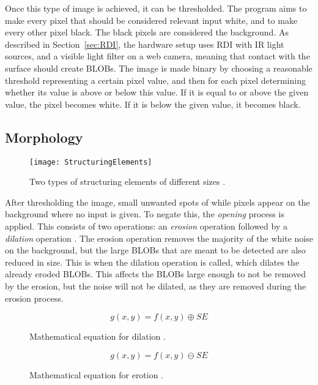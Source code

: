 Once this type of image is achieved, it can be thresholded. The program aims to make every pixel that should be considered relevant input white, and to make every other pixel black. The black pixels are considered the background. As described in Section~\ref{sec:RDI}, the hardware setup uses RDI with IR light sources, and a visible light filter on a web camera, meaning that contact with the surface should create BLOBs. The image is made binary by choosing a reasonable threshold representing a certain pixel value, and then for each pixel determining whether its value is above or below this value. If it is equal to or above the given value, the pixel becomes white. If it is below the given value, it becomes black.
 
\subsection{Morphology}

\begin{figure}[!h]
	\centering
\texttt{[image: StructuringElements]}
\caption{Two types of structuring elements of different sizes \citep{moeslund_introduction_2012}. \label{fig:StructuringElements}}
\end{figure}

After thresholding the image, small unwanted spots of while pixels appear on the background where no input is given. To negate this, the \textit{opening} process is applied. This consists of two operations: an \textit{erosion} operation followed by a \textit{dilation} operation \citep{moeslund_introduction_2012}. The erosion operation removes the majority of the white noise on the background, but the large BLOBs that are meant to be detected are also reduced in size. This is when the dilation operation is called, which dilates the already eroded BLOBs. This affects the BLOBs large enough to not be removed by the erosion, but the noise will not be dilated, as they are removed during the erosion process.

\begin{figure}[!h]
	\centering
	\begin{displaymath}
	g(x, y) = f(x, y) \oplus SE
	\end{displaymath}
	\caption{Mathematical equation for dilation \citep{moeslund_introduction_2012}. \label{fig:dilateEquation}}
\end{figure}

\begin{figure}[!h]
	\centering
	\begin{displaymath}
	g(x, y) = f(x, y) \ominus SE
	\end{displaymath}
	\caption{Mathematical equation for erotion \citep{moeslund_introduction_2012}. \label{fig:erodeEquation}}
\end{figure}

